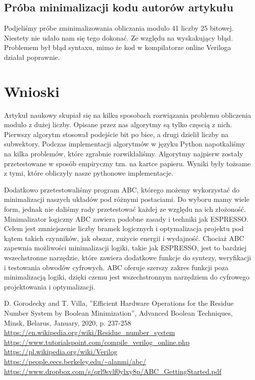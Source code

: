 \documentclass[11pt]{article}
\renewcommand\*{\cdot}
\begin{document}
\subsection{Próba minimalizacji kodu autorów artykułu}
Podjeliśmy próbe zminimalizowania obliczania modulo 41 liczby 25 bitowej. Niestety nie udało nam się tego dokonać. Ze względu na wyskakujący błąd.
Problemem był błąd syntaxu, mimo że kod w kompilatorze online Veriloga działał poprawnie.
\section{Wnioski}
Artykuł naukowy skupiał się na kilku sposobach rozwiązania problemu obliczenia modulo z dużej liczby.
Opisane przez nas algorytmy są tylko częscią z nich.
Pierwszy algorytm stosował podejście bit po bice, a drugi dzielił liczby na subwektory.
Podczas implementacji algorytmów w języku Python napotkaliśmy na kilka problemów, które zgrabnie rozwikłaliśmy.
Algorytmy najpierw zostały przetestowane w sposób empiryczny tzn. na kartce papieru. Wyniki były tożsame z tymi, które obliczyły nasze pythonowe implementacje.


Dodatkowo przetestowaliśmy program ABC, którego możemy wykorzystać do minimalizacji naszych układów pod różnymi postaciami. Do wyboru mamy wiele form, jednak nie daliśmy rady przetestować każdej ze względu na ich złożoność.
Minimalizator logiczny ABC zawiera podobne zasady i techniki jak ESPRESSO.
Celem jest zmniejszenie liczby bramek logicznych i optymalizacja projektu pod kątem takich czynników, jak obszar, zużycie energii i wydajność.  Chociaż ABC zapewnia możliwości minimalizacji logiki, takie jak ESPRESSO, jest to bardziej wszechstronne narzędzie, które zawiera dodatkowe funkcje do syntezy, weryfikacji i testowania obwodów cyfrowych. ABC oferuje szerszy zakres funkcji poza minimalizacją logiki, dzięki czemu jest wszechstronnym narzędziem do cyfrowego projektowania i optymalizacji.
\newpage
\begin{thebibliography}{9}
    D. Gorodecky and T. Villa, ”Efficient Hardware Operations for the Residue Number
    System by Boolean Minimization”, Advanced Boolean Techniques, Minsk, Belarus,
    January, 2020, p. 237-258
     \url{https://en.wikipedia.org/wiki/Residue_number_system}
     \url{https://www.tutorialspoint.com/compile_verilog_online.php}
    \bibitem{} \url{https://pl.wikipedia.org/wiki/Verilog}
    \bibitem{} \url{https://people.eecs.berkeley.edu/~alanmi/abc/}
    \bibitem{} \url{https://www.dropbox.com/s/qrl9svlf0ylxy8p/ABC_GettingStarted.pdf}
\end{thebibliography}
\end{document}
